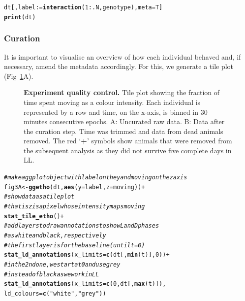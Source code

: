 \documentclass[10pt,letterpaper]{article}\usepackage[]{graphicx}\usepackage[]{color}
\makeatletter
\newcommand{\hlnum}[1]{\textcolor[rgb]{0.686,0.059,0.569}{#1}}%
\newcommand{\hlstr}[1]{\textcolor[rgb]{0.192,0.494,0.8}{#1}}%
\newcommand{\hlcom}[1]{\textcolor[rgb]{0.678,0.584,0.686}{\textit{#1}}}%
\newcommand{\hlopt}[1]{\textcolor[rgb]{0,0,0}{#1}}%
\newcommand{\hlstd}[1]{\textcolor[rgb]{0.345,0.345,0.345}{#1}}%
\newcommand{\hlkwb}[1]{\textcolor[rgb]{0.69,0.353,0.396}{#1}}%
\newcommand{\hlkwc}[1]{\textcolor[rgb]{0.333,0.667,0.333}{#1}}%
\newcommand{\hlkwd}[1]{\textcolor[rgb]{0.737,0.353,0.396}{\textbf{#1}}}%
\newenvironment{kframe}{%
 \def\at@end@of@kframe{}%
 \ifinner\ifhmode%
  \def\at@end@of@kframe{\end{minipage}}%
  \begin{minipage}{\columnwidth}%
 \fi\fi%
 \def\FrameCommand##1{\hskip\@totalleftmargin \hskip-\fboxsep
 \colorbox{shadecolor}{##1}\hskip-\fboxsep
     \hskip-\linewidth \hskip-\@totalleftmargin \hskip\columnwidth}%
 \MakeFramed {\advance\hsize-\width
   \@totalleftmargin\z@ \linewidth\hsize
   \@setminipage}}%
 {\par\unskip\endMakeFramed%
 \at@end@of@kframe}
\newenvironment{knitrout}{}{} %
\makeatother
\begin{document}
\begin{knitrout}
\color{fgcolor}\begin{kframe}
\begin{alltt}
\hlstd{dt[, label} \hlkwb{:=} \hlkwd{interaction}\hlstd{(}\hlnum{1}\hlopt{:}\hlstd{.N, genotype),} \hlkwc{meta} \hlstd{= T]}
\hlkwd{print}\hlstd{(dt)}
\end{alltt}
\end{kframe}
\end{knitrout}


\subsubsection*{Curation}
It is important to visualise an overview of how each individual behaved and, if necessary, amend the metadata accordingly.
For this, we generate a tile plot (Fig~\ref{fig:fig-3}A).

\begin{figure}[!h]
	\caption{{\bf Experiment quality control.}
			Tile plot showing the fraction of time spent moving as a colour intensity.
			Each individual is represented by a row and time, on the x-axis, is binned in 30 minutes consecutive epochs.
			A: Uncurated raw data.
			B: Data after the curation step. Time was trimmed and data from dead animals removed. 
			The red `\textbf{+}' symbols show animals that were removed from the subsequent analysis as they did not survive five complete days in LL.}
	\label{fig:fig-3}
\end{figure}

\begin{knitrout}
\color{fgcolor}\begin{kframe}
\begin{alltt}
\hlcom{# make a ggplot object with label on the y and moving on the z axis}
\hlstd{fig3A} \hlkwb{<-} \hlkwd{ggetho}\hlstd{(dt,} \hlkwd{aes}\hlstd{(}\hlkwc{y} \hlstd{= label,} \hlkwc{z} \hlstd{= moving))} \hlopt{+}
  \hlcom{# show data as a tile plot}
  \hlcom{# that is z is a pixel whose intensity maps moving}
  \hlkwd{stat_tile_etho}\hlstd{()} \hlopt{+}
  \hlcom{# add layers to draw annotations to show L and D phases}
  \hlcom{# as white and black, respectively}
  \hlcom{# the first layer is for the baseline (until t = 0)}
  \hlkwd{stat_ld_annotations}\hlstd{(}\hlkwc{x_limits} \hlstd{=} \hlkwd{c}\hlstd{(dt[,}\hlkwd{min}\hlstd{(t)],} \hlnum{0}\hlstd{))} \hlopt{+}
  \hlcom{# in the 2nd one, we start at 0 and use grey }
  \hlcom{# instead of black as we work in LL}
  \hlkwd{stat_ld_annotations}\hlstd{(}\hlkwc{x_limits} \hlstd{=} \hlkwd{c}\hlstd{(}\hlnum{0}\hlstd{, dt[,} \hlkwd{max}\hlstd{(t)]),}
                      \hlkwc{ld_colours} \hlstd{=} \hlkwd{c}\hlstd{(}\hlstr{"white"}\hlstd{,} \hlstr{"grey"}\hlstd{))}
\end{alltt}
\end{kframe}
\end{knitrout}
\end{document}
